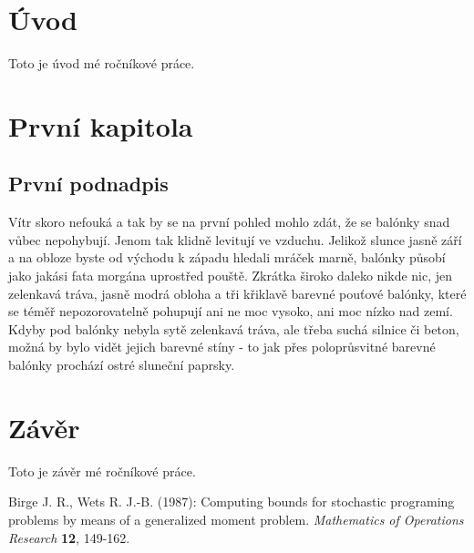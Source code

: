 \documentclass[12pt,a4paper]{report}
\begin{document}


\tableofcontents

\chapter{Úvod}
Toto je úvod mé ročníkové práce.

\chapter{První kapitola} %

\section{První podnadpis}
Vítr skoro nefouká a tak by se na první pohled mohlo zdát, že se balónky snad vůbec nepohybují. Jenom tak klidně levitují ve vzduchu. Jelikož slunce jasně září a na obloze byste od východu k západu hledali mráček marně, balónky působí jako jakási fata morgána uprostřed pouště. Zkrátka široko daleko nikde nic, jen zelenkavá tráva, jasně modrá obloha a tři křiklavě barevné pouťové balónky, které se téměř nepozorovatelně pohupují ani ne moc vysoko, ani moc nízko nad zemí. Kdyby pod balónky nebyla sytě zelenkavá tráva, ale třeba suchá silnice či beton, možná by bylo vidět jejich barevné stíny - to jak přes poloprůsvitné barevné balónky prochází ostré sluneční paprsky.

\chapter{Závěr}
Toto je závěr mé ročníkové práce.

\begin{thebibliography}{99}

Birge J. R., Wets R. J.-B. (1987): Computing bounds for stochastic programing problems by means of a generalized moment problem. \textit{Mathematics of Operations Research} \textbf{12}, 149-162.
\end{thebibliography}


\openright
\end{document}

